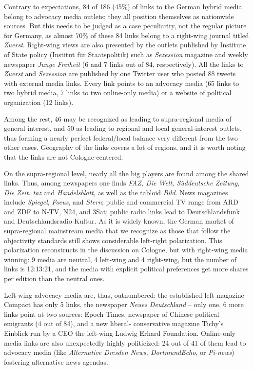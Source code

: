 Contrary to expectations, 84 of 186 (45\%) of links to the German hybrid media belong to advocacy media outlets; they all position themselves as nationwide sources. But this needs to be judged as a case peculiarity, not the regular picture for Germany, as almost 70\% of these 84 links belong to a right-wing journal titled \textit{Zuerst}. Right-wing views are also presented by the outlets published by Institute of State policy (Institut für Staatspolitik) such as \textit{Sezession} magazine and weekly newspaper \textit{Junge Freiheit} (6 and 7 links out of 84, respectively). All the links to \textit{Zuerst} and \textit{Sezession} are published by one Twitter user who posted 88 tweets with external media links. Every link points to an advocacy media (65 links to two hybrid media, 7 links to two online-only media) or a website of political organization (12 links).

Among the rest, 46 may be recognized as leading to supra-regional media of general interest, and 50 as leading to regional and local general-interest outlets, thus forming a nearly perfect federal/local balance very different from the two other cases. Geography of the links covers a lot of regions, and it is worth noting that the links are not Cologne-centered.

On the supra-regional level, nearly all the big players are found among the shared links. Thus, among newspapers one finds \textit{FAZ, Die Welt, Süddeutsche Zeitung, Die Zeit. taz} and \textit{Handelsblatt}, as well as the tabloid \textit{Bild}. News magazines include \textit{Spiegel}, \textit{Focus}, and \textit{Stern}; public and commercial TV range from ARD and ZDF to N-TV, N24, and 3Sat; public radio links lead to Deutschlandsfunk and Deutschlandsradio Kultur. As it is widely known, the German market of supra-regional mainstream media that we recognize as those that follow the objectivity standards still shows considerable left-right polarization. This polarization reconstructs in the discussion on Cologne, but with right-wing media winning: 9 media are neutral, 4 left-wing and 4 right-wing, but the number of links is 12:13:21, and the media with explicit political preferences get more shares per edition than the neutral ones.

Left-wing advocacy media are, thus, outnumbered: the established left magazine Compact has only 5 links, the newspaper \textit{Neues Deutschland} -- only one. 6 more links point at two sources: Epoch Times, newspaper of Chinese political emigrants (4 out of 84), and a new liberal- conservative magazine Tichy’s Einblick run by a CEO the left-wing Ludwig Erhard Foundation. Online-only media links are also unexpectedly highly politicized: 24 out of 41 of them lead to advocacy media (like \textit{Alternative Dresden News, DortmundEcho}, or \textit{Pi-news}) fostering alternative news agendas.

